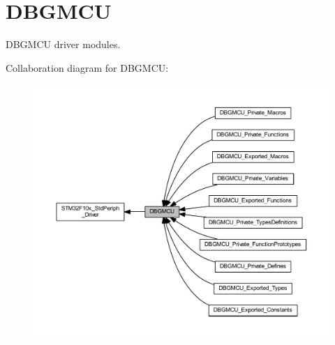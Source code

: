 \hypertarget{group___d_b_g_m_c_u}{}\section{D\+B\+G\+M\+CU}
\label{group___d_b_g_m_c_u}


D\+B\+G\+M\+CU driver modules.  


Collaboration diagram for D\+B\+G\+M\+CU\+:
\nopagebreak
\begin{figure}[H]
\begin{center}
\leavevmode
\includegraphics[width=350pt]{group___d_b_g_m_c_u}
\end{center}
\end{figure}
